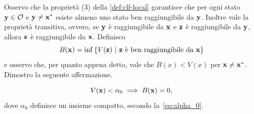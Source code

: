 \begin{steps}
    \item Osservo che la proprietà (3) della \autoref{def:clf-local}
    garantisce che per ogni stato $\mathbf{y} \in \mathcal O$ e $\mathbf{y} \neq \mathbf{x}^*$ esiste
    almeno uno stato ben raggiungibile da $\mathbf{y}$.
    Inoltre vale la proprietà transitiva, ovvero, se $\mathbf{y}$ è raggiungibile da $\mathbf{x}$
    e $\mathbf{z}$ è raggiungibile da $\mathbf{y}$, allora $\mathbf{z}$ è raggiungibile da $\mathbf{x}$.
    Definisco
    \begin{equation*}
        B(\mathbf{x}) = \inf\left\{ V(\mathbf{z})\ |\ \mathbf{z} \text{ è ben raggiungibile da } \mathbf{x} \right\}
    \end{equation*}
    e osservo che, per quanto appena detto, vale che $B(x) < V(x)$ per $\mathbf{x} \neq \mathbf{x}^*$.
    Dimostro la seguente affermazione.

    \begin{aff}
        \begin{equation*}
            V(\mathbf{x}) < \alpha_0 \implies B(\mathbf{x}) = 0,
        \end{equation*}
        dove $\alpha_0$ definisce un insieme compatto, secondo la~\eqref{eq:alpha_0}.
    \end{aff}


\end{steps}
